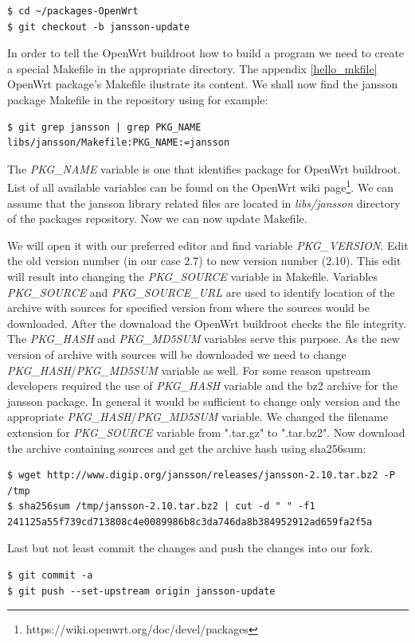 \begin{lstlisting}[columns=fixed,basicstyle=\ttfamily\footnotesize,tabsize=4,backgroundcolor=\color{yellow!10}]
$ cd ~/packages-OpenWrt
$ git checkout -b jansson-update
\end{lstlisting}
In order to tell the OpenWrt buildroot how to build a program we need to create a special Makefile in the appropriate directory.
The appendix \ref{hello_mkfile} OpenWrt package's Makefile ilustrate its content.
We shall now find the jansson package Makefile in the repository using for example:
\begin{lstlisting}[columns=fixed,basicstyle=\ttfamily\footnotesize,tabsize=4,backgroundcolor=\color{yellow!10}]
$ git grep jansson | grep PKG_NAME
libs/jansson/Makefile:PKG_NAME:=jansson
\end{lstlisting}
The {\it PKG\_NAME} variable is one that identifies package for OpenWrt buildroot\cite{creating_pkgs}.
List of all available variables can be found on the OpenWrt wiki page\footnote{https://wiki.openwrt.org/doc/devel/packages}.
We can assume that the jansson library related files are located in {\it libs/jansson} directory of the packages repository.
Now we can now update Makefile.

We will open it with our preferred editor and find variable {\it PKG\_VERSION}.
Edit the old version number (in our case 2.7) to new version number (2.10).
This edit will result into changing the {\it PKG\_SOURCE} variable in Makefile.
Variables {\it PKG\_SOURCE} and {\it PKG\_SOURCE\_URL} are used to identify location of the archive with sources for specified version from where the sources would be downloaded.
After the downaload the OpenWrt buildroot checks the file integrity.
The {\it PKG\_HASH} and {\it PKG\_MD5SUM} variables serve this purpose.
As the new version of archive with sources will be downloaded we need to change {\it PKG\_HASH}/{\it PKG\_MD5SUM} variable as well.
For some reason upstream developers required the use of {\it PKG\_HASH} variable and the bz2 archive for the jansson package.
In general it would be sufficient to change only version and the appropriate {\it PKG\_HASH}/{\it PKG\_MD5SUM} variable.
We changed the filename extension for {\it PKG\_SOURCE} variable from ".tar.gz" to ".tar.bz2".
Now download the archive containing sources and get the archive hash using sha256sum:
\begin{lstlisting}[columns=fixed,basicstyle=\ttfamily\footnotesize,tabsize=4,backgroundcolor=\color{yellow!10}]
$ wget http://www.digip.org/jansson/releases/jansson-2.10.tar.bz2 -P /tmp
$ sha256sum /tmp/jansson-2.10.tar.bz2 | cut -d " " -f1
241125a55f739cd713808c4e0089986b8c3da746da8b384952912ad659fa2f5a
\end{lstlisting}
Last but not least commit the changes and push the changes into our fork.
\begin{lstlisting}[columns=fixed,basicstyle=\ttfamily\footnotesize,tabsize=4,backgroundcolor=\color{yellow!10}]
$ git commit -a
$ git push --set-upstream origin jansson-update
\end{lstlisting}

